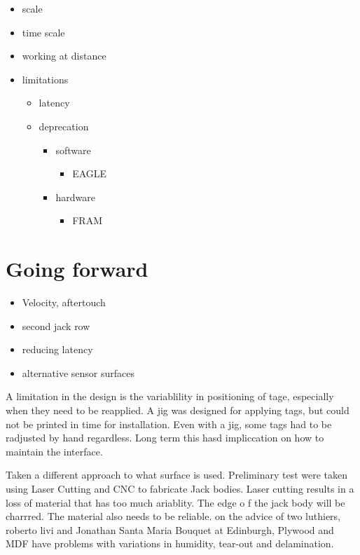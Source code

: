 \begin{itemize}
\item
  scale
\item
  time scale
\item
  working at distance
\item
  limitations

  \begin{itemize}
  \item
    latency
  \item
    deprecation

    \begin{itemize}
    \item
      software

      \begin{itemize}
      \item
        EAGLE
      \end{itemize}
    \item
      hardware

      \begin{itemize}
      \item
        FRAM
      \end{itemize}
    \end{itemize}
  \end{itemize}
\end{itemize}

\section{Going forward}\label{going-forward}

\begin{itemize}
\item
  Velocity, aftertouch
\item
  second jack row
\item
  reducing latency
\item
  alternative sensor surfaces
\end{itemize}

A limitation in the design is the variablility in positioning of tage,
especially when they need to be reapplied. A jig was designed for
applying tags, but could not be printed in time for installation. Even
with a jig, some tags had to be radjusted by hand regardless. Long term
this hasd impliccation on how to maintain the interface.

Taken a different approach to what surface is used. Preliminary test
were taken using Laser Cutting and CNC to fabricate Jack bodies. Laser
cutting results in a loss of material that has too much ariablity. The
edge o f the jack body will be charrred. The material also needs to be
reliable. on the advice of two luthiers, roberto livi and Jonathan Santa
Maria Bouquet at Edinburgh, Plywood and MDF have problems with
variations in humidity, tear-out and delamination.

